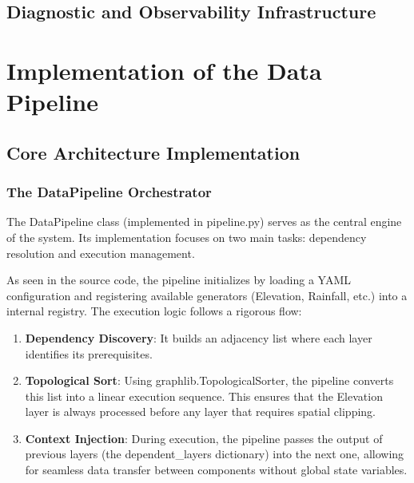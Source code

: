 
\subsection{Diagnostic and Observability Infrastructure}











\section{Implementation of the Data Pipeline}


\subsection{Core Architecture Implementation}


\subsubsection{The DataPipeline Orchestrator}

The DataPipeline class (implemented in pipeline.py) serves as the central engine of the system. Its implementation 
focuses on two main tasks: dependency resolution and execution management.

As seen in the source code, the pipeline initializes by loading a YAML configuration and registering available 
generators (Elevation, Rainfall, etc.) into a internal registry. The execution logic follows a rigorous flow:

\begin{enumerate}
    \item \textbf{Dependency Discovery}: It builds an adjacency list where each layer identifies its prerequisites.
    \item \textbf{Topological Sort}: Using graphlib.TopologicalSorter, the pipeline converts this list into a 
    linear execution sequence. This ensures that the Elevation layer is always processed before any layer that 
    requires spatial clipping.
    \item \textbf{Context Injection}: During execution, the pipeline passes the output of previous layers (the 
    dependent\_layers dictionary) into the next one, allowing for seamless data transfer between components without 
    global state variables.
\end{enumerate}

